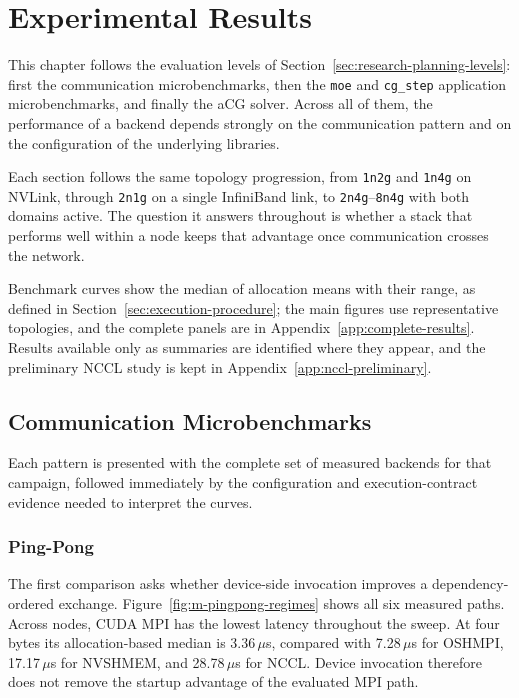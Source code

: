 \chapter{Experimental Results}\label{ch:m-results}

This chapter follows the evaluation levels of Section~\ref{sec:research-planning-levels}: first the communication microbenchmarks, then the \texttt{moe} and \texttt{cg\_step} application microbenchmarks, and finally the aCG solver. Across all of them, the performance of a backend depends strongly on the communication pattern and on the configuration of the underlying libraries.

Each section follows the same topology progression, from \texttt{1n2g} and \texttt{1n4g} on NVLink, through \texttt{2n1g} on a single InfiniBand link, to \texttt{2n4g}--\texttt{8n4g} with both domains active. The question it answers throughout is whether a stack that performs well within a node keeps that advantage once communication crosses the network.

Benchmark curves show the median of allocation means with their range, as defined in Section~\ref{sec:execution-procedure}; the main figures use representative topologies, and the complete panels are in Appendix~\ref{app:complete-results}. Results available only as summaries are identified where they appear, and the preliminary NCCL study is kept in Appendix~\ref{app:nccl-preliminary}.

\section{Communication Microbenchmarks}\label{sec:micro-results}

Each pattern is presented with the complete set of measured backends for that campaign, followed immediately by the configuration and execution-contract evidence needed to interpret the curves.

\subsection{Ping-Pong}

The first comparison asks whether device-side invocation improves a dependency-ordered exchange. Figure~\ref{fig:m-pingpong-regimes} shows all six measured paths. Across nodes, CUDA MPI has the lowest latency throughout the sweep. At four bytes its allocation-based median is 3.36\,$\mu$s, compared with 7.28\,$\mu$s for OSHMPI, 17.17\,$\mu$s for NVSHMEM, and 28.78\,$\mu$s for NCCL. Device invocation therefore does not remove the startup advantage of the evaluated MPI path.


